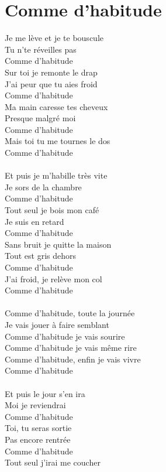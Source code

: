 \section*{Comme d'habitude}
Je me lève et je te bouscule\\
Tu n’te réveilles pas\\
Comme d'habitude\\
Sur toi je remonte le drap\\
J'ai peur que tu aies froid\\
Comme d'habitude\\
Ma main caresse tes cheveux\\
Presque malgré moi\\
Comme d'habitude\\
Mais toi tu me tournes le dos\\
Comme d'habitude\\\\
Et puis je m'habille très vite\\
Je sors de la chambre\\
Comme d'habitude\\
Tout seul je bois mon café\\
Je suis en retard\\
Comme d'habitude\\
Sans bruit je quitte la maison\\
Tout est gris dehors\\
Comme d'habitude\\
J'ai froid, je relève mon col\\
Comme d'habitude\\\\
Comme d'habitude, toute la journée\\
Je vais jouer à faire semblant\\
Comme d'habitude je vais sourire\\
Comme d'habitude je vais même rire\\
Comme d'habitude, enfin je vais vivre\\
Comme d'habitude\\\\
Et puis le jour s'en ira\\
Moi je reviendrai\\
Comme d'habitude\\
Toi, tu seras sortie\\
Pas encore rentrée\\
Comme d'habitude\\
Tout seul j'irai me coucher\\
